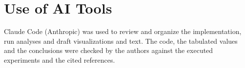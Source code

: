 \documentclass[conference]{IEEEtran}
\begin{document}
\section*{Use of AI Tools}
Claude Code (Anthropic) was used to review and organize the implementation, run analyses and draft visualizations and text.
The code, the tabulated values and the conclusions were checked by the authors against the executed experiments and the cited
references.



\end{document}
